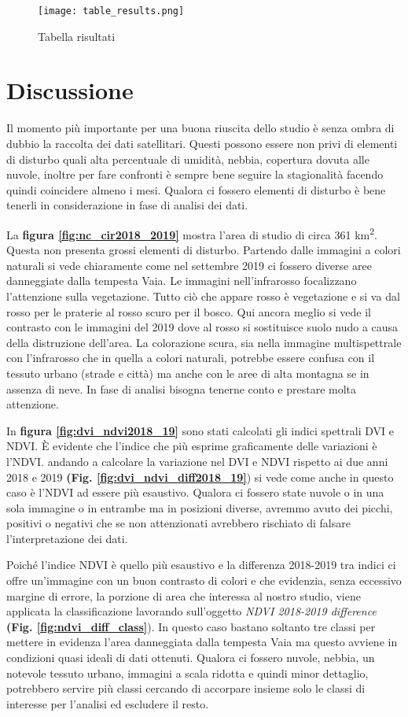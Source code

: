 \documentclass[a4paper,12pt]{article}
\begin{document}
\begin{figure}
\centering
    \texttt{[image: table\_results.png]}
    \caption{Tabella risultati}
    \label{fig:results}
\end{figure}

\newpage
\section{Discussione}
Il momento più importante per una buona riuscita dello studio è senza ombra di dubbio la raccolta dei dati satellitari. Questi possono essere non privi di elementi di disturbo quali alta percentuale di umidità, nebbia, copertura dovuta alle nuvole, inoltre per fare confronti è sempre bene seguire la stagionalità facendo quindi coincidere almeno i mesi. Qualora ci fossero elementi di disturbo è bene tenerli in considerazione in fase di analisi dei dati. 

La \textbf{figura \ref{fig:nc_cir2018_2019}} mostra l'area di studio di circa 361 km\textsuperscript{2}. Questa non presenta grossi elementi di disturbo. Partendo dalle immagini a colori naturali si vede chiaramente come nel settembre 2019 ci fossero diverse aree danneggiate dalla tempesta Vaia. Le immagini nell'infrarosso focalizzano l'attenzione sulla vegetazione. Tutto ciò che appare rosso è vegetazione e si va dal rosso per le praterie al rosso scuro per il bosco. Qui ancora meglio si vede il contrasto con le immagini del 2019 dove al rosso si sostituisce suolo nudo a causa della distruzione dell'area. La colorazione scura, sia nella immagine multispettrale con l'infrarosso che in quella a colori naturali, potrebbe essere confusa con il tessuto urbano (strade e città) ma anche con le aree di alta montagna se in assenza di neve. In fase di analisi bisogna tenerne conto e prestare molta attenzione.

In \textbf{figura \ref{fig:dvi_ndvi2018_19}} sono stati calcolati gli indici spettrali DVI e NDVI. \`E evidente che l'indice che più esprime graficamente delle variazioni è l'NDVI. andando a calcolare la variazione nel DVI e NDVI rispetto ai due anni 2018 e 2019 \textbf{(Fig. \ref{fig:dvi_ndvi_diff2018_19}}) si vede come anche in questo caso è l'NDVI ad essere più esaustivo. Qualora ci fossero state nuvole o in una sola immagine o in entrambe ma in posizioni diverse, avremmo avuto dei picchi, positivi o negativi che se non attenzionati avrebbero rischiato di falsare l'interpretazione dei dati.

Poiché l'indice NDVI è quello più esaustivo e la differenza 2018-2019 tra indici ci offre un'immagine con un buon contrasto di colori e che evidenzia, senza eccessivo margine di errore, la porzione di area che interessa al nostro studio,  viene applicata la classificazione lavorando sull'oggetto \textit{NDVI 2018-2019 difference} \textbf{(Fig. \ref{fig:ndvi_diff_class}}). In questo caso bastano soltanto tre classi per mettere in evidenza l'area danneggiata dalla tempesta Vaia ma questo avviene in condizioni quasi ideali di dati ottenuti. Qualora ci fossero nuvole, nebbia, un notevole tessuto urbano, immagini a scala ridotta e quindi minor dettaglio, potrebbero servire più classi cercando di accorpare insieme solo le classi di interesse per l'analisi ed escludere il resto.
\end{document}
